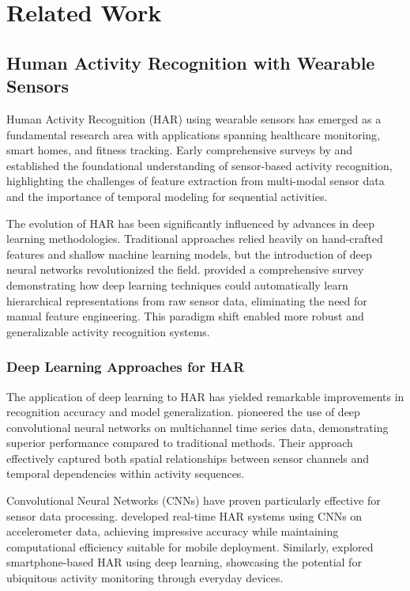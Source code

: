 \chapter{Related Work}

\section{Human Activity Recognition with Wearable Sensors}

\hspace{2em}Human Activity Recognition (HAR) using wearable sensors has emerged as a fundamental research area with applications spanning healthcare monitoring, smart homes, and fitness tracking. Early comprehensive surveys by \cite{Bulling2014HARSurvey} and \cite{Lara2013Mobile} established the foundational understanding of sensor-based activity recognition, highlighting the challenges of feature extraction from multi-modal sensor data and the importance of temporal modeling for sequential activities.

The evolution of HAR has been significantly influenced by advances in deep learning methodologies. Traditional approaches relied heavily on hand-crafted features and shallow machine learning models, but the introduction of deep neural networks revolutionized the field. \cite{Wang2019DeepHAR} provided a comprehensive survey demonstrating how deep learning techniques could automatically learn hierarchical representations from raw sensor data, eliminating the need for manual feature engineering. This paradigm shift enabled more robust and generalizable activity recognition systems.

\subsection{Deep Learning Approaches for HAR}

\hspace{2em}The application of deep learning to HAR has yielded remarkable improvements in recognition accuracy and model generalization. \cite{Yang2015DeepConvLSTM} pioneered the use of deep convolutional neural networks on multichannel time series data, demonstrating superior performance compared to traditional methods. Their approach effectively captured both spatial relationships between sensor channels and temporal dependencies within activity sequences.

Convolutional Neural Networks (CNNs) have proven particularly effective for sensor data processing. \cite{Ignatov2018RealTime} developed real-time HAR systems using CNNs on accelerometer data, achieving impressive accuracy while maintaining computational efficiency suitable for mobile deployment. Similarly, \cite{Ronao2016Human} explored smartphone-based HAR using deep learning, showcasing the potential for ubiquitous activity monitoring through everyday devices.

